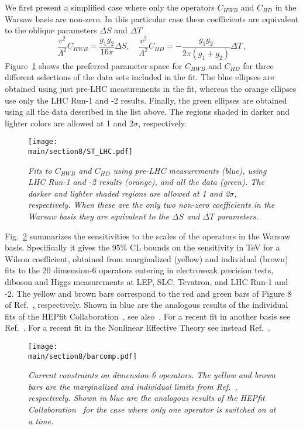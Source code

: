 \documentclass[../report.tex]{subfiles}
\providecommand{\main}{..}
\begin{document}
We first present a simplified case where only the operators $C_{HWB}$ and $C_{HD}$ in the Warsaw basis are non-zero.
In this particular case these coefficients are equivalent to the oblique parameters $\Delta S$ and $\Delta T$~\cite{Grinstein:1991cd}
\begin{equation}
\frac{v^2}{\Lambda^2} C_{HWB} = \frac{g_1 g_2}{16 \pi} \Delta S, \quad \frac{v^2}{\Lambda^2} C_{HD} = - \frac{g_1 g_2}{2 \pi \left(g_1 + g_2\right)} \Delta T \, ,
\end{equation}
Figure~\ref{fig8:SandT} shows the preferred parameter space for 
$C_{HWB}$ and $C_{HD}$ for three different selections of the data sets included in the fit.
The blue ellipses are obtained using just pre-LHC measurements in the fit, 
whereas the orange ellipses use only the LHC Run-1 and -2 results.
Finally, the green ellipses are obtained using all the data described in the list above.
The regions shaded in darker and lighter colors are allowed at 1 and 2$\sigma$, respectively. 
\begin{figure}[t!]
  \centering
\texttt{[image: \\main/section8/ST\_LHC.pdf]}
 \caption{\it Fits to $C_{HWB}$ and $C_{HD}$ using pre-LHC measurements (blue), using LHC Run-1 and -2 results (orange), and all the data (green). The darker and lighter shaded regions are allowed at 1 and 2$\sigma$, respectively. When these are the only two non-zero coefficients in the Warsaw basis they are equivalent to the $\Delta S$ and $\Delta T$ parameters. }
   \label{fig8:SandT}
\end{figure}

Fig.~\ref{fig8:HEPfitvsEMSY} summarizes the sensitivities to the scales of the operators in the Warsaw basis.
Specifically it gives the 95\% CL bounds on the sensitivity in TeV for a Wilson coefficient, obtained from marginalized (yellow) and individual (brown) fits to the 20 dimension-6 operators entering in electroweak precision tests, diboson and Higgs measurements at LEP, SLC, Tevatron, and LHC Run-1 and -2.
The yellow and brown bars correspond to the red and green bars of Figure 8 of Ref.~\cite{Ellis:2018gqa}, respectively.
Shown in blue are the analogous results of the individual fits of the HEPfit Collaboration~\cite{Ciuchini:2013pca, deBlas:2016ojx}, see also~\cite{luca:talk, otto:talk}.
For a recent fit in another basis see Ref.~\cite{Alves:2018nof}.
For a recent fit in the Nonlinear Effective Theory see instead Ref.~\cite{deBlas:2018tjm}.
\begin{figure}
  \centering
\texttt{[image: \\main/section8/barcomp.pdf]}
 \caption{\it Current constraints on dimension-6 operators. The yellow and brown bars are the marginalized and individual limits from Ref.~\cite{Ellis:2018gqa}, respectively. Shown in blue are the analogous results of the HEPfit Collaboration~\cite{Ciuchini:2013pca, deBlas:2016ojx} for the case where only one operator is switched on at a time.}
   \label{fig8:HEPfitvsEMSY}
\end{figure} 
\end{document}
